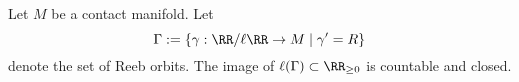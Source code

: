 
 
    Let $M$ be a contact manifold. Let 
    \[\Gamma:=\{\gamma: \RR/\ell\RR\to M \;|\;\gamma'=R\}\]
    denote the set of Reeb orbits. The image of $\ell(\Gamma)\subset \RR_{\geq 0}$ is countable and closed.
    \label{prp:countableNumberOfReebPeriods}
 